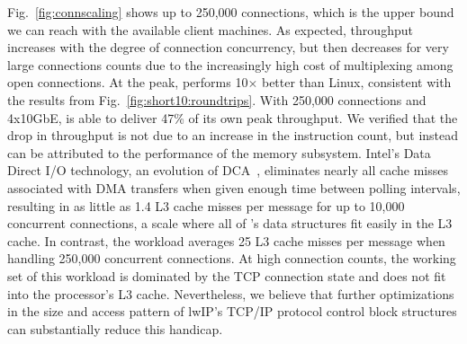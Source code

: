 


Fig.~\ref{fig:connscaling} shows up to 250,000
connections, which is the upper bound we can reach with the available
client machines.  As expected, throughput increases with the degree of
connection concurrency, but then decreases for very large connections
counts due to the increasingly high cost of multiplexing among open
connections.  At the peak, \ix performs 10$\times$ better than
Linux, consistent with the results from
Fig.~\ref{fig:short10:roundtrips}.
With 250,000 connections and 4x10GbE, \ix is able to deliver
47\% of its own peak throughput.  We verified that the drop
in throughput is not due to an increase in the instruction count, but
instead can be attributed to the performance of the memory
subsystem. Intel's Data Direct I/O technology, an evolution of
DCA~\cite{DBLP:conf/isca/HuggahalliIT05}, eliminates nearly all cache
misses associated with DMA transfers when given enough time between
polling intervals, resulting in as little as 1.4 L3 cache misses per
message for up to 10,000 concurrent connections, a scale where all of \ix's data structures fit easily in the L3 cache.  In contrast, the
workload averages 25 L3 cache misses per message when handling 250,000
concurrent connections.  At high connection counts, the working set of
this workload is dominated by the TCP connection state and does not
fit into the processor's L3 cache.  Nevertheless, we believe that
further optimizations in the size and access pattern of lwIP's TCP/IP
protocol control block structures can substantially reduce this
handicap.
  



